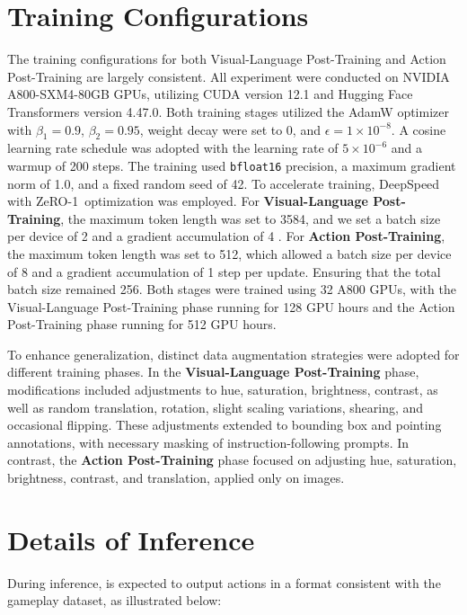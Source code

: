 \section{Training Configurations}\label{app:training_configs}


The training configurations for both Visual-Language Post-Training and Action Post-Training are largely 
consistent. All experiment were conducted on NVIDIA A800-SXM4-80GB GPUs, utilizing CUDA version 12.1 and Hugging Face Transformers version 4.47.0. %
Both training stages utilized the AdamW optimizer with $\beta_1 = 0.9$, $\beta_2 = 0.95$, weight decay were set to 0, and $\epsilon = 1\times10^{-8}$. A cosine learning rate schedule was adopted with the learning rate of $5\times10^{-6}$ and a warmup of 200 steps. The training used \texttt{bfloat16} precision, a maximum gradient norm of 1.0, and a fixed random seed of 42. To accelerate training, DeepSpeed with ZeRO-1~\citep{deepspeed}optimization was employed. For \textbf{Visual-Language Post-Training}, the maximum token length was set to 3584, and we set 
a batch size per device of 2 and a gradient accumulation of 4
. For \textbf{Action Post-Training}, the maximum token length was set to 512, which allowed a batch size per device of 8 and a gradient accumulation of 1 step per update. Ensuring that the total batch size remained 256. Both stages were trained using 32 A800 GPUs, with the Visual-Language Post-Training phase running for 128 GPU hours and the Action Post-Training phase running for 512 GPU hours.


To enhance generalization, distinct data augmentation strategies were adopted for different training phases. In the \textbf{Visual-Language Post-Training} phase, modifications included adjustments to hue, saturation, brightness, contrast, as well as random translation, rotation, slight scaling variations, shearing, and occasional flipping. These adjustments extended to bounding box and pointing annotations, with necessary masking of instruction-following prompts. In contrast, the \textbf{Action Post-Training} phase focused on adjusting hue, saturation, brightness, contrast, and translation, applied only on images.



\section{Details of Inference}
During inference, \model is expected to output actions in a format consistent with the gameplay dataset, as illustrated below:

